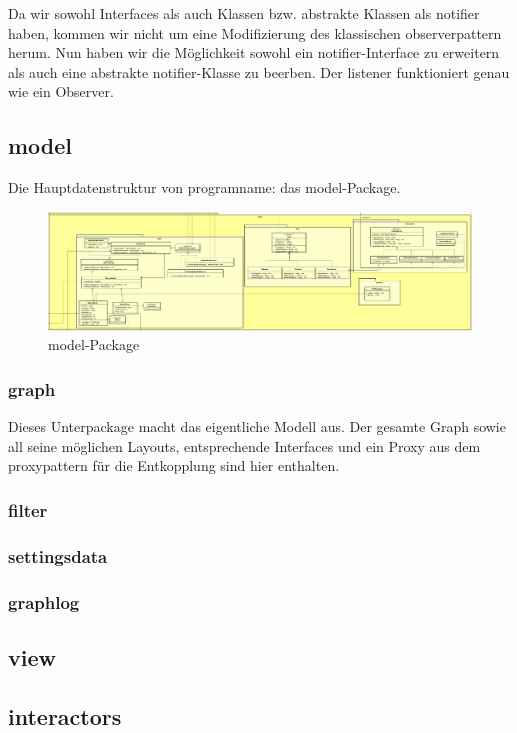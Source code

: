 Da wir sowohl Interfaces als auch Klassen bzw. abstrakte Klassen als
\gls{notifier} haben, kommen wir nicht um eine Modifizierung des klassischen
\gls{observerpattern} herum. Nun haben wir die Möglichkeit sowohl ein
\gls{notifier}-Interface zu erweitern als auch eine abstrakte
\gls{notifier}-Klasse zu beerben. Der \gls{listener} funktioniert genau wie ein
Observer.


\subsection{model}
\label{subsec:model}

Die Hauptdatenstruktur von \gls{programname}: das model-Package.

\begin{figure}[H]
  \centering
  \includegraphics[width=\textwidth]{../diagramimages/model.png}
  \caption{model-Package}
\end{figure}

    \subsubsection{graph}
    Dieses Unterpackage macht das eigentliche Modell aus. Der gesamte Graph sowie all seine möglichen Layouts, entsprechende Interfaces und ein Proxy aus dem \gls{proxypattern} für die Entkopplung sind hier enthalten.
    \subsubsection{filter}

    \subsubsection{settingsdata}

    \subsubsection{graphlog}


\subsection{view}
\label{subsec:view}

\subsection{interactors}
\label{subsec:interactors}
